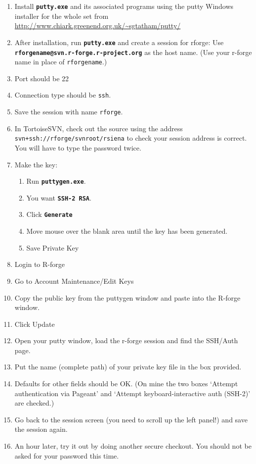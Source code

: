 \documentclass[12pt, a4paper]{article}
\renewcommand{\=}{\,=\,}
\newcommand{\+}{\,+\,}
\newcommand{\sfn}[1]{\textbf{\texttt{#1}}}
\begin{document}
\begin{enumerate}
\item Install \sfn{putty.exe} and its associated programs using the putty
  Windows installer for the whole set from
  {\small{\url{http://www.chiark.greenend.org.uk/~sgtatham/putty/}}}
\item After installation, run \sfn{putty.exe} and create a session for rforge:
Use \sfn{rforgename@svn.r-forge.r-project.org} as the host name. (Use your
r-forge name in place of \verb|rforgename|.)
\item Port should be 22
\item Connection type should be \verb|ssh|.
\item Save the session with name \verb|rforge|.
\item In TortoiseSVN, check out the source using the address
  \verb|svn+ssh://rforge/svnroot/rsiena| to check your session address is
  correct. You will have to type the password twice.
\item Make the key:
\begin{enumerate}
\item Run \sfn{puttygen.exe}.
\item You want \sfn{SSH-2 RSA}.
\item Click \sfn{Generate}
\item Move mouse over the blank area until the key has been generated.
\item Save Private Key
\end{enumerate}
\item Login to R-forge
\item Go to Account Maintenance/Edit Keys
\item Copy the public key from the puttygen window and paste into the R-forge
  window.
\item Click Update
\item Open your putty window, load the r-forge session and find the SSH/Auth
  page.
\item Put the name (complete path) of your private key file in the box provided.
\item Defaults for other fields should be OK. (On mine the two boxes  `Attempt
  authentication via Pageant' and `Attempt keyboard-interactive auth (SSH-2)'
  are checked.)
\item Go back to the session screen (you need to scroll up the left panel!) and
  save the session again.
\item An hour later, try it out by doing another secure checkout. You should not
  be asked for your password this time.
\end{enumerate}
\end{document}
